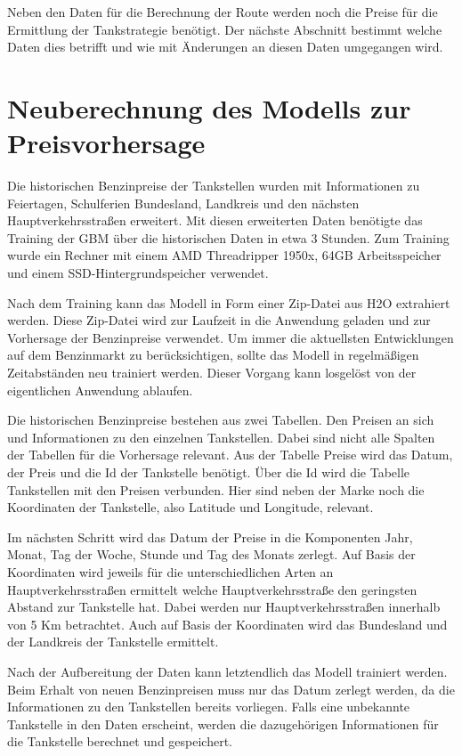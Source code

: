 \documentclass[
ngerman          %
,a4paper          %
,11pt
,pdftex
]{report}
\begin{document}
Neben den Daten für die Berechnung der Route werden noch die Preise für die Ermittlung der Tankstrategie benötigt. Der nächste Abschnitt bestimmt welche Daten dies betrifft und wie mit Änderungen an diesen Daten umgegangen wird.
\section{Neuberechnung des Modells zur Preisvorhersage}
\label{sec:org2499f4b}
Die historischen Benzinpreise der Tankstellen wurden mit Informationen zu Feiertagen, Schulferien Bundesland, Landkreis und den nächsten Hauptverkehrsstraßen erweitert. Mit diesen erweiterten Daten benötigte das Training der \ac{GBM} über die historischen Daten in etwa 3 Stunden. Zum Training wurde ein Rechner mit einem AMD Threadripper 1950x, 64GB Arbeitsspeicher und einem SSD-Hintergrundspeicher verwendet.

Nach dem Training kann das Modell in Form einer Zip-Datei aus H2O extrahiert werden. Diese Zip-Datei wird zur Laufzeit in die Anwendung geladen und zur Vorhersage der Benzinpreise verwendet. Um immer die aktuellsten Entwicklungen auf dem Benzinmarkt zu berücksichtigen, sollte das Modell in regelmäßigen Zeitabständen neu trainiert werden. Dieser Vorgang kann losgelöst von der eigentlichen Anwendung ablaufen.

Die historischen Benzinpreise bestehen aus zwei Tabellen. Den Preisen an sich und Informationen zu den einzelnen Tankstellen. Dabei sind nicht alle Spalten der Tabellen für die Vorhersage relevant. Aus der Tabelle Preise wird das Datum, der Preis und die Id der Tankstelle benötigt. Über die Id wird die Tabelle Tankstellen mit den Preisen verbunden. Hier sind neben der Marke noch die Koordinaten der Tankstelle, also Latitude und Longitude, relevant.

Im nächsten Schritt wird das Datum der Preise in die Komponenten Jahr, Monat, Tag der Woche, Stunde und Tag des Monats zerlegt. Auf Basis der Koordinaten wird jeweils für die unterschiedlichen Arten an Hauptverkehrsstraßen ermittelt welche Hauptverkehrsstraße den geringsten Abstand zur Tankstelle hat. Dabei werden nur Hauptverkehrsstraßen innerhalb von 5 Km betrachtet. Auch auf Basis der Koordinaten wird das Bundesland und der Landkreis der Tankstelle ermittelt.

Nach der Aufbereitung der Daten kann letztendlich das Modell trainiert werden. Beim Erhalt von neuen Benzinpreisen muss nur das Datum zerlegt werden, da die Informationen zu den Tankstellen bereits vorliegen. Falls eine unbekannte Tankstelle in den Daten erscheint, werden die dazugehörigen Informationen für die Tankstelle berechnet und gespeichert.
\end{document}
